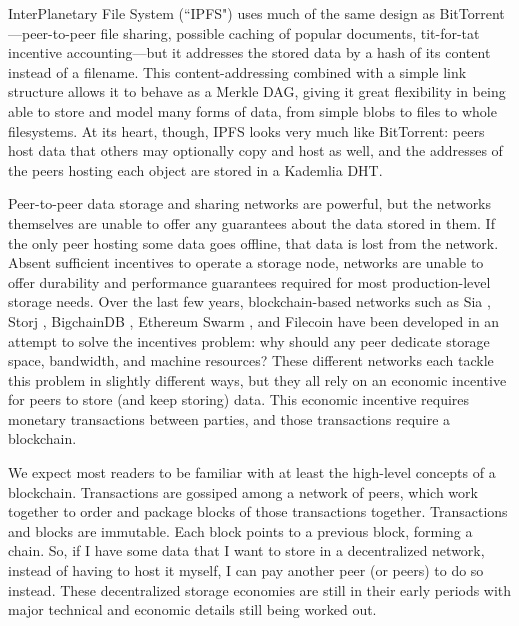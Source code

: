 \documentclass[10pt]{article}
\begin{document}
InterPlanetary File System (``IPFS") \cite{ipfs} uses much of the same design as BitTorrent---peer-to-peer file sharing, possible caching of popular documents, tit-for-tat incentive accounting---but it addresses the stored data by a hash of its content instead of a filename. This content-addressing combined with a simple link structure allows it to behave as a Merkle DAG, giving it great flexibility in being able to store and model many forms of data, from simple blobs to files to whole filesystems. At its heart, though, IPFS looks very much like BitTorrent: peers host data that others may optionally copy and host as well, and the addresses of the peers hosting each object are stored in a Kademlia DHT.

Peer-to-peer data storage and sharing networks are powerful, but the networks themselves are unable to offer any guarantees about the data stored in them. If the only peer hosting some data goes offline, that data is lost from the network. Absent sufficient incentives to operate a storage node, networks are unable to offer durability and performance guarantees required for most production-level storage needs. Over the last few years, blockchain-based networks such as Sia \cite{sia}, Storj \cite{storj}, BigchainDB \cite{bigchaindb,bigchaindb2}, Ethereum Swarm \cite{swarm1,swarm2}, and Filecoin \cite{filecoin} have been developed in an attempt to solve the incentives problem: why should any peer dedicate storage space, bandwidth, and machine resources? These different networks each tackle this problem in slightly different ways, but they all rely on an economic incentive for peers to store (and keep storing) data. This economic incentive requires monetary transactions between parties, and those transactions require a blockchain. 

We expect most readers to be familiar with at least the high-level concepts of a blockchain. Transactions are gossiped among a network of peers, which work together to order and package blocks of those transactions together. Transactions and blocks are immutable. Each block points to a previous block, forming a chain. So, if I have some data that I want to store in a decentralized network, instead of having to host it myself, I can pay another peer (or peers) to do so instead. These decentralized storage economies are still in their early periods with major technical and economic details still being worked out.
\end{document}
